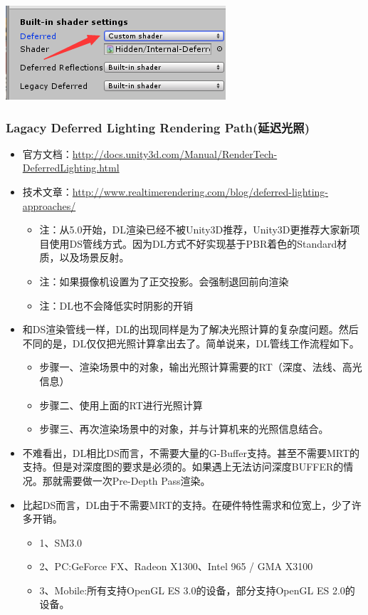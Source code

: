 \documentclass[9pt, b5paper]{article}
\begin{document}
\begin{enumerate}
\begin{center}
\includegraphics[width=.9\linewidth]{./pic/builtinshader.png}
\end{center}
\end{enumerate}

\subsubsection{Lagacy Deferred Lighting Rendering Path(延迟光照)}
\label{sec:orge9f7adc}
\begin{itemize}
\item 官方文档：\url{http://docs.unity3d.com/Manual/RenderTech-DeferredLighting.html}
\item 技术文章：\url{http://www.realtimerendering.com/blog/deferred-lighting-approaches/}
\begin{itemize}
\item 注：从5.0开始，DL渲染已经不被Unity3D推荐，Unity3D更推荐大家新项目使用DS管线方式。因为DL方式不好实现基于PBR着色的Standard材质，以及场景反射。
\item 注：如果摄像机设置为了正交投影。会强制退回前向渲染
\item 注：DL也不会降低实时阴影的开销
\end{itemize}
\item 和DS渲染管线一样，DL的出现同样是为了解决光照计算的复杂度问题。然后不同的是，DL仅仅把光照计算拿出去了。简单说来，DL管线工作流程如下。
\begin{itemize}
\item 步骤一、渲染场景中的对象，输出光照计算需要的RT（深度、法线、高光信息）
\item 步骤二、使用上面的RT进行光照计算
\item 步骤三、再次渲染场景中的对象，并与计算机来的光照信息结合。
\end{itemize}
\item 不难看出，DL相比DS而言，不需要大量的G-Buffer支持。甚至不需要MRT的支持。但是对深度图的要求是必须的。如果遇上无法访问深度BUFFER的情况。那就需要做一次Pre-Depth Pass渲染。
\item 比起DS而言，DL由于不需要MRT的支持。在硬件特性需求和位宽上，少了许多开销。
\begin{itemize}
\item 1、SM3.0
\item 2、PC:GeForce FX、Radeon X1300、Intel 965 / GMA X3100
\item 3、Mobile:所有支持OpenGL ES 3.0的设备，部分支持OpenGL ES 2.0的设备。
\end{itemize}
\end{itemize}
\end{document}
